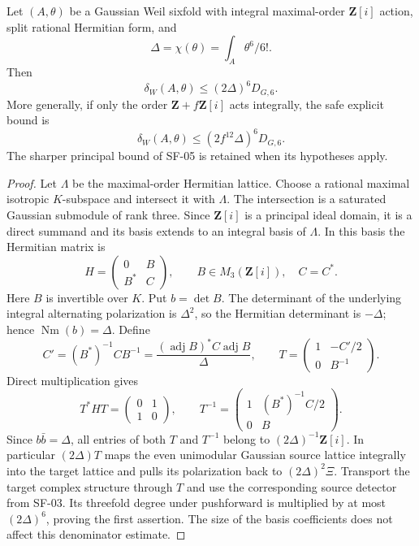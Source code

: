 \begin{proposition}
\label{SF-04a}
Let $(A,\theta)$ be a Gaussian Weil sixfold with integral maximal-order
$\mathbf Z[i]$ action, split rational Hermitian form, and
\[
 \Delta=\chi(\theta)=\int_A\theta^6/6!.
\]
Then
\[
 \delta_W(A,\theta)\le(2\Delta)^6D_{G,6}.
\]
More generally, if only the order $\mathbf Z+f\mathbf Z[i]$ acts
integrally, the safe explicit bound is
\[
 \delta_W(A,\theta)\le(2f^{12}\Delta)^6D_{G,6}.
\]
The sharper principal bound of SF-05 is retained when its hypotheses
apply.
\end{proposition}
\begin{proof}
Let $\Lambda$ be the maximal-order Hermitian lattice. Choose a
rational maximal isotropic $K$-subspace and intersect it with
$\Lambda$. The intersection is a saturated Gaussian submodule of
rank three. Since $\mathbf Z[i]$ is a principal ideal domain, it is
a direct summand and its basis extends to an integral basis of
$\Lambda$. In this basis the Hermitian matrix is
\[
 H=\begin{pmatrix}0&B\\B^*&C\end{pmatrix},\qquad
 B\in M_3(\mathbf Z[i]),\quad C=C^*.
\]
Here $B$ is invertible over $K$. Put $b=\det B$. The determinant
of the underlying integral alternating polarization is $\Delta^2$,
so the Hermitian determinant is $-\Delta$; hence
$\operatorname{Nm}(b)=\Delta$. Define
\[
 C'=(B^*)^{-1}CB^{-1}
   =\frac{(\operatorname{adj}B)^*C\operatorname{adj}B}{\Delta},
 \qquad
 T=\begin{pmatrix}1&-C'/2\\0&B^{-1}\end{pmatrix}.
\]
Direct multiplication gives
\[
 T^*HT=\begin{pmatrix}0&1\\1&0\end{pmatrix},\qquad
 T^{-1}=\begin{pmatrix}1&(B^*)^{-1}C/2\\0&B\end{pmatrix}.
\]
Since $b\bar b=\Delta$, all entries of both $T$ and $T^{-1}$
belong to $(2\Delta)^{-1}\mathbf Z[i]$. In particular
$(2\Delta)T$ maps the even unimodular Gaussian source lattice
integrally into the target lattice and pulls its polarization back
to $(2\Delta)^2\Xi$. Transport the target complex structure through
$T$ and use the corresponding source detector from SF-03. Its
threefold degree under pushforward is multiplied by at most
$(2\Delta)^6$, proving the first assertion. The size of the basis
coefficients does not affect this denominator estimate.


\end{proof}

